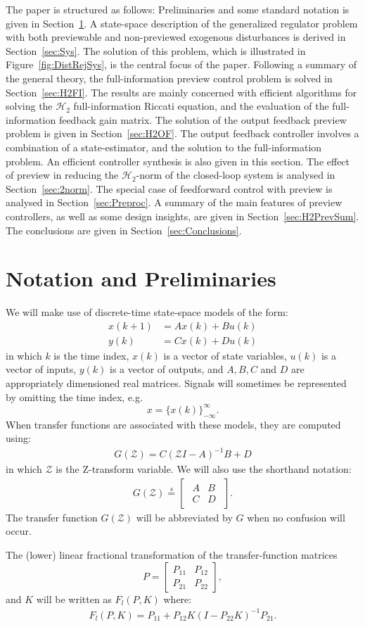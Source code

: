 \documentclass[a4paper,12pt]{article}
\theoremstyle{remark}
\newcommand{\ssmodf}[4]{
        \ma{\begin{array}{c|c }
        #1 & #2 \\ \hline
        #3 & #4
        \end{array}}}
\newcommand{\shorteq}{\stackrel{s}{=}}
\newcommand{\ma}[1]{\begin{bmatrix} #1 \end{bmatrix}}
\newcommand{\als}[1]{\begin{align*} #1 \end{align*}}
\newcommand{\aln}[1]{\begin{align} #1 \end{align}}
\newcommand{\htwo}{\mathcal H_2}
\begin{document}
The paper is structured as follows: Preliminaries and some standard notation is given in Section~\ref{sec:notation}. A state-space description of the generalized regulator problem with both previewable and non-previewed exogenous disturbances is derived in Section~\ref{sec:Sys}. The solution of this problem, which is illustrated in Figure~\ref{fig:DistRejSys}, is the central focus of the paper. Following a summary of the general theory, the full-information preview control problem is solved in Section~\ref{sec:H2FI}. The results are mainly concerned with efficient algorithms for solving the $\htwo$ full-information Riccati equation, and the evaluation of the full-information feedback gain matrix. The solution of the output feedback preview problem is given in Section~\ref{sec:H2OF}. The output feedback controller involves a combination of a state-estimator, and the solution to the full-information problem. An efficient controller synthesis is also given in this section. The effect of preview in reducing the $\htwo$-norm of the closed-loop system is analysed in Section~\ref{sec:2norm}. The special case of feedforward control with preview is analysed in Section~\ref{sec:Preproc}. A summary of the main features of preview controllers, as well as some design insights, are given in Section~\ref{sec:H2PrevSum}. The conclusions are given in Section~\ref{sec:Conclusions}.
 
\section{Notation and Preliminaries}
\label{sec:notation}
We will make use of discrete-time state-space models of the form:
\als{
x(k+1)&=Ax(k)+Bu(k)\\
y(k)&=Cx(k)+Du(k)
}
in which $k$ is the time index, $x(k)$ is a vector of state variables, $u(k)$ is a vector of inputs, $y(k)$ is a vector of outputs, and $A,B,C$ and $D$ are appropriately dimensioned real matrices. Signals will sometimes be represented by omitting the time index, e.g.
$$x=\{x(k)\}^{\infty}_{-\infty}.$$
When transfer functions are associated with these models, they are computed using:
\als{
G(\mathcal{Z})=C(\mathcal{Z} I -A)^{-1}B+D
}
in which $\mathcal{Z}$ is the Z-transform variable. We will also use the shorthand notation:
\aln{
G(\mathcal{Z})\shorteq\ssmodf{A}{B}{C}{D}\label{eqn:GABCD}.
}
The transfer function $G(\mathcal{Z})$ will be abbreviated by $G$ when no confusion will occur.

The (lower) linear fractional transformation of the transfer-function matrices $$P=\ma{P_{11} &P_{12}\\P_{21} & P_{22}},$$ and $K$ will be written as $F_l(P,K)$ where: 
 \als{F_l(P,K)=P_{11}+P_{12}K(I-P_{22}K)^{-1}P_{21}.} 
\end{document}
